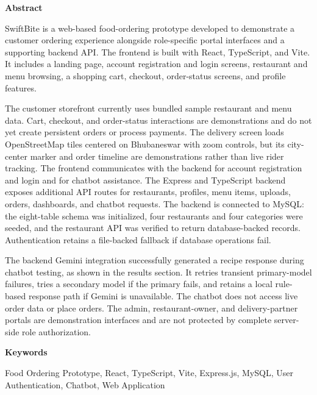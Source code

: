 \begin{center}

\vspace*{0.3in}

\Large{\textbf{Abstract}}

\vspace{5mm}

\end{center}

\justifying

SwiftBite is a web-based food-ordering prototype developed to demonstrate a customer ordering experience alongside role-specific portal interfaces and a supporting backend API. The frontend is built with React, TypeScript, and Vite. It includes a landing page, account registration and login screens, restaurant and menu browsing, a shopping cart, checkout, order-status screens, and profile features.

\vspace{0.5cm}

The customer storefront currently uses bundled sample restaurant and menu data. Cart, checkout, and order-status interactions are demonstrations and do not yet create persistent orders or process payments. The delivery screen loads OpenStreetMap tiles centered on Bhubaneswar with zoom controls, but its city-center marker and order timeline are demonstrations rather than live rider tracking. The frontend communicates with the backend for account registration and login and for chatbot assistance. The Express and TypeScript backend exposes additional API routes for restaurants, profiles, menu items, uploads, orders, dashboards, and chatbot requests. The backend is connected to MySQL: the eight-table schema was initialized, four restaurants and four categories were seeded, and the restaurant API was verified to return database-backed records. Authentication retains a file-backed fallback if database operations fail.

\vspace{0.5cm}

The backend Gemini integration successfully generated a recipe response during chatbot testing, as shown in the results section. It retries transient primary-model failures, tries a secondary model if the primary fails, and retains a local rule-based response path if Gemini is unavailable. The chatbot does not access live order data or place orders. The admin, restaurant-owner, and delivery-partner portals are demonstration interfaces and are not protected by complete server-side role authorization.

\vspace{5mm}

\noindent\textbf{Keywords}

\noindent Food Ordering Prototype, React, TypeScript, Vite, Express.js, MySQL, User Authentication, Chatbot, Web Application

